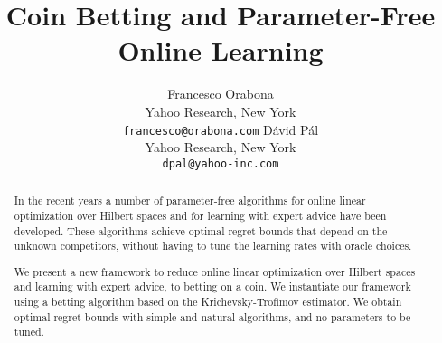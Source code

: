 \documentclass{article}
\author{
  Francesco Orabona\\
  Yahoo Research, New York\\
  \texttt{francesco@orabona.com}
  \And
  D\'avid P\'al\\
  Yahoo Research, New York\\
  \texttt{dpal@yahoo-inc.com}
}
\title{Coin Betting and Parameter-Free Online Learning}
\begin{document}
\maketitle

\begin{abstract}
In the recent years a number of parameter-free algorithms for online linear
optimization over Hilbert spaces and for learning with expert advice have been
developed. These algorithms achieve optimal regret bounds that depend on the
unknown competitors, without having to tune the learning rates with oracle
choices.

We present a new framework to reduce online linear optimization over Hilbert
spaces and learning with expert advice, to betting on a coin. We instantiate
our framework using a betting algorithm based on the Krichevsky-Trofimov
estimator.  We obtain optimal regret bounds with simple and natural algorithms,
and no parameters to be tuned.
\end{abstract}












\begin{small}
\newpage
\setlength{\bibsep}{0pt}


\end{small}

\appendix





\end{document}

